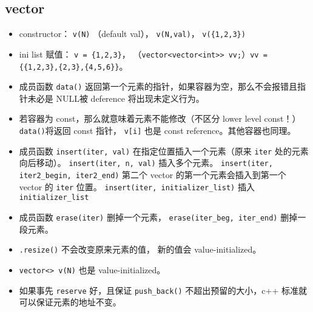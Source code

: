 \subsection{vector}
\begin{itemize}
\item constructor： \verb|v(N)| （default val）， \verb|v(N,val)|， \verb|v({1,2,3})|
\item ini list 赋值： \verb|v = {1,2,3}|， （\verb|vector<vector<int>> vv;|）\verb|vv = {{1,2,3},{2,3},{4,5,6}}|。
\item 成员函数 \verb`data()` 返回第一个元素的指针，如果容器为空，那么不会报错且指针未必是 NULL被 deference 将出现未定义行为。
\item 若容器为 const，那么就意味着元素不能修改（不区分 lower level const！） \verb`data()`将返回 const 指针， \verb`v[i]` 也是 const reference。其他容器也同理。
\item 成员函数 \verb|insert(iter, val)| 在指定位置插入一个元素（原来 \verb|iter| 处的元素向后移动）。 \verb|insert(iter, n, val)| 插入多个元素。 \verb|insert(iter, iter2_begin, iter2_end)| 第二个 vector 的第一个元素会插入到第一个 vector 的 \verb|iter| 位置。 \verb|insert(iter, initializer_list)| 插入 \verb|initializer_list|
\item 成员函数 \verb|erase(iter)| 删掉一个元素， \verb|erase(iter_beg, iter_end)| 删掉一段元素。
\item \verb|.resize()| 不会改变原来元素的值， 新的值会 value-initialized。
\item \verb|vector<> v(N)| 也是 value-initialized。
\item 如果事先 \verb|reserve| 好，且保证 \verb|push_back()| 不超出预留的大小，c++ 标准就可以保证元素的地址不变。
\end{itemize}


